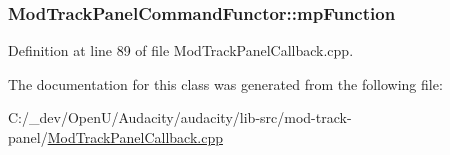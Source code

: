 \subsubsection[{\texorpdfstring{mp\+Function}{mpFunction}}]{ Mod\+Track\+Panel\+Command\+Functor\+::mp\+Function}\hypertarget{class_mod_track_panel_command_functor_ac8393c96b91a462ea07e3098dc491088}{}\label{class_mod_track_panel_command_functor_ac8393c96b91a462ea07e3098dc491088}


Definition at line 89 of file Mod\+Track\+Panel\+Callback.\+cpp.



The documentation for this class was generated from the following file\+:\begin{DoxyCompactItemize}
\item 
C\+:/\+\_\+dev/\+Open\+U/\+Audacity/audacity/lib-\/src/mod-\/track-\/panel/\hyperlink{_mod_track_panel_callback_8cpp}{Mod\+Track\+Panel\+Callback.\+cpp}\end{DoxyCompactItemize}
